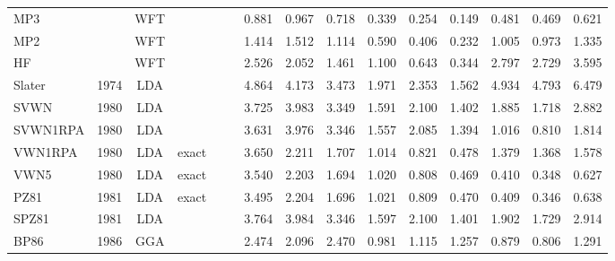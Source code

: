 \begin{landscape}
\begin{longtable}{ll:cccc:rrr:rrr:rrr}
    MP3              &      & WFT  &          &             &           & 0.881             & 0.967             & 0.718  & 0.339              & 0.254             & 0.149  & 0.481   & 0.469 & 0.621 \\
    MP2              &      & WFT  &          &             &           & 1.414             & 1.512             & 1.114  & 0.590              & 0.406             & 0.232  & 1.005   & 0.973 & 1.335 \\
    HF               &      & WFT  &          &             &           & 2.526             & 2.052             & 1.461  & 1.100              & 0.643             & 0.344  & 2.797   & 2.729 & 3.595 \\
    Slater           & 1974 & LDA  &          &             &           & 4.864             & 4.173             & 3.473  & 1.971              & 2.353             & 1.562  & 4.934   & 4.793 & 6.479 \\
    SVWN             & 1980 & LDA  &          &             &           & 3.725             & 3.983             & 3.349  & 1.591              & 2.100             & 1.402  & 1.885   & 1.718 & 2.882 \\
    SVWN1RPA         & 1980 & LDA  &          &             &           & 3.631             & 3.976             & 3.346  & 1.557              & 2.085             & 1.394  & 1.016   & 0.810 & 1.814 \\
    VWN1RPA          & 1980 & LDA  & exact    &             &           & 3.650             & 2.211             & 1.707  & 1.014              & 0.821             & 0.478  & 1.379   & 1.368 & 1.578 \\
    VWN5             & 1980 & LDA  & exact    &             &           & 3.540             & 2.203             & 1.694  & 1.020              & 0.808             & 0.469  & 0.410   & 0.348 & 0.627 \\
    PZ81             & 1981 & LDA  & exact    &             &           & 3.495             & 2.204             & 1.696  & 1.021              & 0.809             & 0.470  & 0.409   & 0.346 & 0.638 \\
    SPZ81            & 1981 & LDA  &          &             &           & 3.764             & 3.984             & 3.346  & 1.597              & 2.100             & 1.401  & 1.902   & 1.729 & 2.914 \\
    BP86             & 1986 & GGA  &          &             &           & 2.474             & 2.096             & 2.470  & 0.981              & 1.115             & 1.257  & 0.879   & 0.806 & 1.291 \\

\end{longtable}
\end{landscape}
